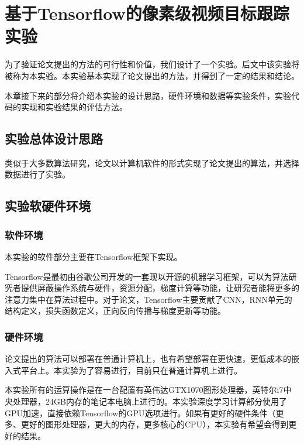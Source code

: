
\chapter{基于Tensorflow的像素级视频目标跟踪实验} \label{section:experiment}
为了验证论文提出的方法的可行性和价值，我们设计了一个实验。后文中该实验将被称为本实验。本实验基本实现了论文提出的方法，并得到了一定的结果和结论。
\par
本章接下来的部分将介绍本实验的设计思路，硬件环境和数据等实验条件，实验代码的实现和实验结果的评估方法。

\section{实验总体设计思路}
类似于大多数算法研究，论文以计算机软件的形式实现了论文提出的算法，并选择数据进行了实验。

\section{实验软硬件环境}
\subsection{软件环境}
本实验的软件部分主要在Tensorflow\supercite{abadi2016tensorflow}框架下实现。
\par
Tensorflow是最初由谷歌公司开发的一套现以开源的机器学习框架，可以为算法研究者提供屏蔽操作系统与硬件，资源分配，梯度计算等功能，让研究者能将更多的注意力集中在算法过程中。对于论文，Tensorflow主要贡献了CNN，RNN单元的结构定义，损失函数定义，正向反向传播与梯度更新等功能。

\subsection{硬件环境}
\par
论文提出的算法可以部署在普通计算机上，也有希望部署在更快速，更低成本的嵌入式平台上。本实验为了容易进行，目前只在普通计算机上进行。
\par
本实验所有的运算操作是在一台配置有英伟达GTX1070图形处理器，英特尔i7中央处理器，24GB内存的笔记本电脑上进行的。本实验深度学习计算部分使用了GPU加速，直接依赖Tensorflow的GPU选项进行。如果有更好的硬件条件（更多、更好的图形处理器，更大的内存，更多核心的CPU），本实验有希望会得到更好的结果。

